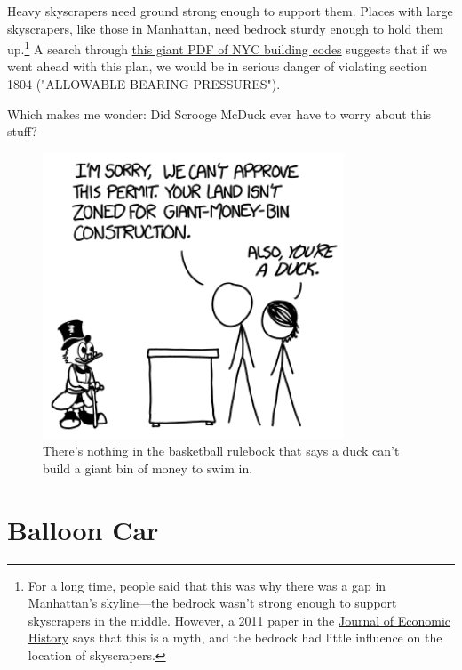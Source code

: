 {{Heavy skyscrapers need ground strong enough to support them. Places with large skyscrapers, like those in Manhattan, need bedrock sturdy enough to hold them up.{\footnote{For a long time, people said that this was why there was a gap in Manhattan's skyline—the bedrock wasn't strong enough to support skyscrapers in the middle. However, a 2011 paper in the \href{http://journals.cambridge.org/action/displayAbstract?fromPage=online&aid=8429737}{Journal of Economic History} says that this is a myth, and the bedrock had little influence on the location of skyscrapers.} } A search through \href{http://www2.iccsafe.org/states/newyorkcity/Building/PDFs/Chapter\%2018\_Soils\%20and\%20Foundations.pdf}{this giant PDF of NYC building codes} suggests that if we went ahead with this plan, we would be in serious danger of violating section 1804 ("ALLOWABLE BEARING PRESSURES").}

{Which makes me wonder: Did Scrooge McDuck ever have to worry about this stuff?}

\begin{figure}[!htbp]
\centering
\includegraphics[scale=0.5, max width=0.8\textwidth]{imgs/a/111/zoning.png}
\caption{There's nothing in the basketball rulebook that says a duck can't build a giant bin of money to swim in.}
\end{figure}

{
\chapter{Balloon Car}
}

}
